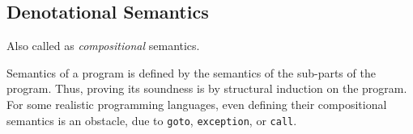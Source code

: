 \subsection{Denotational Semantics}
Also called as \textit{compositional} semantics.

Semantics of a program is defined by the semantics of the sub-parts of
the program. Thus, proving its soundness is by structural induction on
the program. For some realistic programming languages, even defining
their compositional semantics is an obstacle, due to \texttt{goto},
\texttt{exception}, or \texttt{call}.


